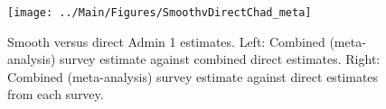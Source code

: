 \documentclass[12pt]{article}\usepackage[]{graphicx}\usepackage[]{color}
\newenvironment{knitrout}{}{} %
\begin{document}



\begin{knitrout}
\color{fgcolor}\begin{figure}[bht]

{\centering \texttt{[image: ../Main/Figures/SmoothvDirectChad\_meta]} 

}

\caption[Smooth versus direct Admin 1 estimates]{Smooth versus direct Admin 1 estimates. Left: Combined (meta-analysis) survey estimate against combined direct estimates. Right: Combined (meta-analysis) survey estimate against direct estimates from each survey.}\label{fig:unnamed-chunk-53}
\end{figure}


\end{knitrout}
\end{document}
